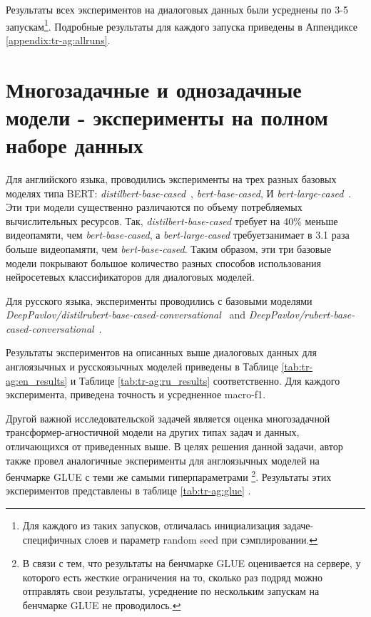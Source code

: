 Результаты всех экспериментов на диалоговых данных были усреднены по 3-5 запускам\footnote{ Для каждого из таких запусков, отличалась инициализация задаче-специфичных слоев и параметр random seed при сэмплировании.}. Подробные результаты для каждого запуска приведены в Аппендиксе \ref{appendix:tr-ag:allruns}. 

\section{Многозадачные и однозадачные модели - эксперименты на полном наборе данных} 
Для английского языка, проводились эксперименты на трех разных базовых моделях типа BERT: \textit{distilbert-base-cased}~\cite{alina}, \textit{bert-base-cased}, И \textit{bert-large-cased}~\cite{bert}.  Эти три модели существенно различаются по объему потребляемых вычислительных ресурсов. Так, 
\textit{distilbert-base-cased} требует на 40\% меньше видеопамяти, чем \textit{bert-base-cased}, а \textit{bert-large-cased} требуетзанимает в  3.1 раза больше видеопамяти, чем \textit{bert-base-cased}. Таким образом, эти три базовые модели покрывают большое количество разных способов использования нейросетевых классификаторов для диалоговых моделей. 

Для русского языка, эксперименты проводились с базовыми моделями \textit{DeepPavlov/distilrubert-base-cased-conversational}~\cite{distilrubert} and \textit{DeepPavlov/rubert-base-cased-conversational}~\cite{rubert}.

Результаты экспериментов на описанных выше диалоговых данных для англоязычных и русскоязычных моделей приведены в Таблице \ref{tab:tr-ag:en_results} и Таблице \ref{tab:tr-ag:ru_results} соответственно. Для каждого эксперимента, приведена точность и усредненное macro-f1.

Другой важной исследовательской задачей является оценка многозадачной трансформер-агностичной модели на других типах задач и данных, отличающихся от приведенных выше. В целях решения данной задачи, автор также провел аналогичные эксперименты для англоязычных моделей на бенчмарке GLUE\cite{GLUE:19} с теми же самыми гиперпараметрами \footnote{В связи с тем, что результаты на бенчмарке GLUE оценивается на сервере, у которого есть жесткие ограничения на то, сколько раз подряд можно отправлять свои результаты, усреднение по нескольким запускам на бенчмарке GLUE не проводилось.}. Результаты этих экспериментов представлены в таблице \ref{tab:tr-ag:glue} .

